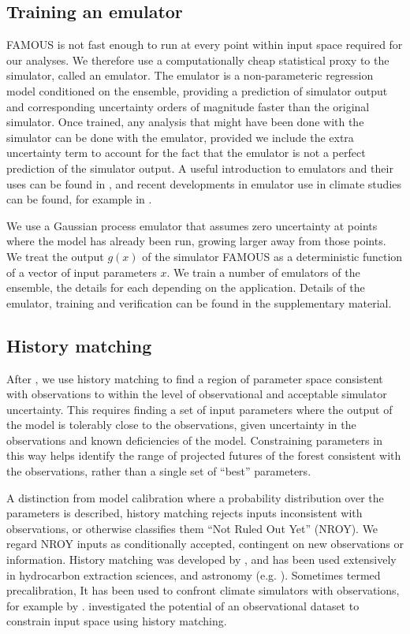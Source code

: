 \documentclass[esd, article]{copernicus} %
\begin{document}
\subsection{Training an emulator}\label{ssec:emulator}
FAMOUS is not fast enough to run at every point within input space required for our analyses. We therefore use a computationally cheap statistical proxy to the simulator, called an emulator. The emulator is a non-parameteric regression model conditioned on the ensemble, providing a prediction of simulator output and corresponding uncertainty orders of magnitude faster than the original simulator. Once trained, any analysis that might have been done with the simulator can be done with the emulator, provided we include the extra uncertainty term to account for the fact that the emulator is not a perfect prediction of the simulator output. A useful introduction to emulators and their uses can be found in \cite{o2006bayesian}, and recent developments in emulator use in climate studies can be found, for example in \cite{tran2016building,bounceur2015global}.

We use a Gaussian process emulator that assumes zero uncertainty at points where the model has already been run, growing larger away from those points. We treat the output $g(x)$ of the simulator FAMOUS as a deterministic function of a vector of input parameters $x$. We train a number of emulators of the ensemble, the details for each depending on the application. Details of the emulator, training and verification can be found in the supplementary material.

\subsection{History matching}\label{ssec:historymatching}
After \cite{williamson2014identifying}, we use history matching to find a region of parameter space consistent with observations to within the level of observational and acceptable simulator uncertainty. This requires finding a set of input parameters where the output of the model is tolerably close to the observations, given uncertainty in the observations and known deficiencies of the model. Constraining parameters in this way helps identify the range of projected futures of the forest consistent with the observations, rather than a single set of ``best'' parameters.

A distinction from model calibration where a probability distribution over the parameters is described, history matching rejects inputs inconsistent with observations, or otherwise classifies them ``Not Ruled Out Yet'' (NROY).  We regard NROY inputs as conditionally accepted, contingent on new observations or information. History matching was developed by \cite{craig1997pressure}, and has been used extensively in hydrocarbon extraction sciences, and astronomy (e.g. \cite{vernon2010galaxy}). Sometimes termed precalibration, It has been used to confront climate simulators with observations, for example by \cite{lee2016aerosol, williamson2013history, holden2009precalibration}. \cite{mcneall2013potential} investigated the potential of an observational dataset to constrain input space using history matching.
\end{document}
